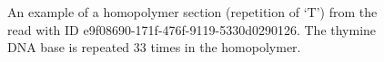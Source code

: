 \begin{figure}
\centering

\caption{\label{fig:homo-section}An example of a homopolymer section (repetition of `T') from the read with ID e9f08690-171f-476f-9119-5330d0290126. The thymine DNA base is repeated 33 times in the homopolymer.}
\end{figure}
